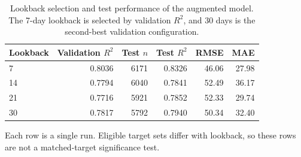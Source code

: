\begin{table}[!htbp]
\centering
\caption{Lookback selection and test performance of the augmented model. The 7-day lookback is selected by validation $R^2$, and 30 days is the second-best validation configuration.}\label{tab:lookback}
\setlength{\tabcolsep}{4pt}
\begin{tabular}{lrrrrr}
\toprule
Lookback & Validation $R^2$ & Test $n$ & Test $R^2$ & RMSE & MAE \\
\midrule
7 & 0.8036 & 6171 & 0.8326 & 46.06 & 27.98 \\
14 & 0.7794 & 6040 & 0.7841 & 52.49 & 36.17 \\
21 & 0.7716 & 5921 & 0.7852 & 52.33 & 29.74 \\
30 & 0.7817 & 5792 & 0.7940 & 50.34 & 32.40 \\
\bottomrule
\end{tabular}
\par\smallskip\begin{minipage}{0.98\linewidth}\footnotesize Each row is a single run. Eligible target sets differ with lookback, so these rows are not a matched-target significance test.\end{minipage}
\end{table}

